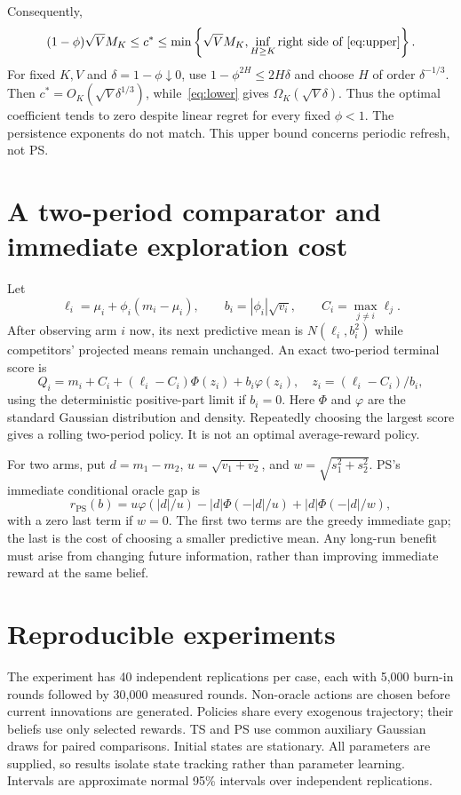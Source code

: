 \documentclass[11pt]{article}
\begin{document}
Consequently,
\begin{equation}
(1-\phi)\sqrt V M_K\leq c^*\leq
\min\left\{\sqrt V M_K,\inf_{H\geq K}\text{right side of~\eqref{eq:upper}}\right\}.
\end{equation}
For fixed $K,V$ and $\delta=1-\phi\downarrow0$, use $1-\phi^{2H}\leq2H\delta$ and choose $H$ of order $\delta^{-1/3}$. Then $c^*=O_K(\sqrt V\delta^{1/3})$, while~\eqref{eq:lower} gives $\Omega_K(\sqrt V\delta)$. Thus the optimal coefficient tends to zero despite linear regret for every fixed $\phi<1$. The persistence exponents do not match. This upper bound concerns periodic refresh, not PS.

\section{A two-period comparator and immediate exploration cost}
Let
\[
\ell_i=\mu_i+\phi_i(m_i-\mu_i),\qquad b_i=|\phi_i|\sqrt{v_i},
\qquad C_i=\max_{j\ne i}\ell_j.
\]
After observing arm $i$ now, its next predictive mean is $N(\ell_i,b_i^2)$ while competitors' projected means remain unchanged. An exact two-period terminal score is
\begin{equation}
Q_i=m_i+C_i+(\ell_i-C_i)\Phi(z_i)+b_i\varphi(z_i),\quad
z_i=(\ell_i-C_i)/b_i,
\end{equation}
using the deterministic positive-part limit if $b_i=0$. Here $\Phi$ and $\varphi$ are the standard Gaussian distribution and density. Repeatedly choosing the largest score gives a rolling two-period policy. It is not an optimal average-reward policy.

For two arms, put $d=m_1-m_2$, $u=\sqrt{v_1+v_2}$, and $w=\sqrt{s_1^2+s_2^2}$. PS's immediate conditional oracle gap is
\begin{equation}
r_{\mathrm{PS}}(b)=u\varphi(|d|/u)-|d|\Phi(-|d|/u)
+|d|\Phi(-|d|/w),
\end{equation}
with a zero last term if $w=0$. The first two terms are the greedy immediate gap; the last is the cost of choosing a smaller predictive mean. Any long-run benefit must arise from changing future information, rather than improving immediate reward at the same belief.

\section{Reproducible experiments}
The experiment has 40 independent replications per case, each with 5,000 burn-in rounds followed by 30,000 measured rounds. Non-oracle actions are chosen before current innovations are generated. Policies share every exogenous trajectory; their beliefs use only selected rewards. TS and PS use common auxiliary Gaussian draws for paired comparisons. Initial states are stationary. All parameters are supplied, so results isolate state tracking rather than parameter learning. Intervals are approximate normal 95\% intervals over independent replications.
\end{document}
